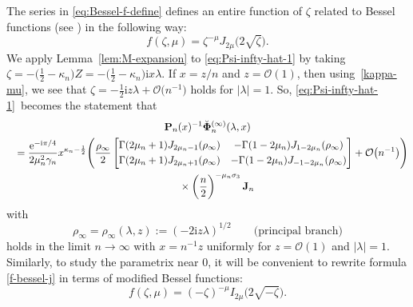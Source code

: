 \documentclass[pdftex]{sigma}
\numberwithin{equation}{section}
\newcommand{\ee}{\mathrm{e}}
\newcommand{\ii}{\mathrm{i}}
\newcommand{\para}[1]{\breve{#1}}
\begin{document}
The series in \eqref{eq:Bessel-f-define} defines an entire function of $\zeta$ related to Bessel functions (see \cite[Chapter~10]{DLMF}) in the following way:
\begin{equation}
\label{f-bessel-j}
 f(\zeta,\mu)=\zeta^{-{\mu}{}}J_{2\mu}\big(2\sqrt{\zeta}\big).
\end{equation}
We apply Lemma~\ref{lem:M-expansion} to \eqref{eq:Psi-infty-hat-1} by taking $\zeta=-\big(\frac{1}{2}-\kappa_n\big)Z=-\big(\frac{1}{2}-\kappa_n\big)\ii x\lambda$. If $x=z/n$ and $z=\mathcal{O}(1)$, then using~\eqref{kappa-mu}, we see that $\zeta=-\frac{1}{2}\ii z\lambda + \mathcal{O}\big(n^{-1}\big)$ holds for $|\lambda|=1$. So, \eqref{eq:Psi-infty-hat-1}~becomes the statement that
\begin{gather*}
 \mathbf{P}_n(x)^{-1}\para{\mathbf{\Phi}}_n^{(\infty)}(\lambda,x)
\\
\quad=\frac{\ee^{-\ii\pi/4}}{2\mu_n^2\gamma_n}x^{\kappa_n-\frac{1}{2}}\Bigg(\frac{\rho_\infty}{2}\begin{bmatrix}
 \Gamma(2\mu_n+1) J_{2\mu_n-1}(\rho_\infty) & -\Gamma(1-2\mu_n) J_{1-2\mu_n}(\rho_\infty) \vspace{1mm}\\
 \Gamma(2\mu_n+1) J_{2\mu_n+1}(\rho_\infty) & -\Gamma(1-2\mu_n) J_{-1-2\mu_n}(\rho_\infty)
 \end{bmatrix}+\mathcal{O}\big(n^{-1}\big)\Bigg) \\
 \phantom{\quad=}{}\times\left(\dfrac{n}{2} \right)^{-\mu_n \sigma_3}
 \mathbf{J}_n
\end{gather*}
with
\begin{equation}
 \rho_\infty=\rho_\infty(\lambda,z):=(-2\ii z\lambda)^{1/2}\qquad\text{(principal branch)}
 \label{eq:rho-infty-branch}
\end{equation}
holds in the limit $n\to\infty$ with $x=n^{-1}z$ uniformly for $z=\mathcal{O}(1)$ and $|\lambda|=1$. Similarly, to study the parametrix near 0, it will be convenient to rewrite formula \eqref{f-bessel-j} in terms of modified Bessel functions:
\begin{equation*}
 f(\zeta, \mu) = (-\zeta)^{-\mu} I_{2\mu}\big(2 \sqrt{-\zeta} \big).
\end{equation*}
\end{document}
